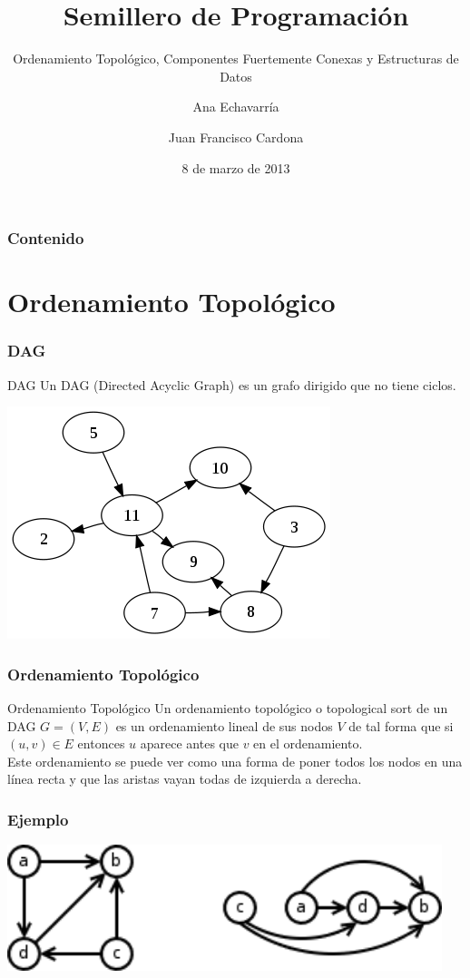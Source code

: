 \documentclass{beamer}
\title{Semillero de Programación}
\subtitle{Ordenamiento Topológico, Componentes Fuertemente Conexas y Estructuras de Datos}
\author{Ana Echavarría \and Juan Francisco Cardona}
\institute{Universidad EAFIT}
\date{8 de marzo de 2013}
\begin{document}
\begin{frame}
	\titlepage
\end{frame}

\begin{frame}
	\frametitle{Contenido}
	\tableofcontents
\end{frame}

\section{Ordenamiento Topológico}
	\begin{frame}
		\frametitle{DAG}
		\begin{block}{DAG}
			Un DAG (Directed Acyclic Graph) es un grafo dirigido que no tiene ciclos.
		\end{block}
		\begin{center} \includegraphics[height = 0.4\textheight]{DAG.png} \end{center}
	\end{frame}
	
	\begin{frame}
		\frametitle{Ordenamiento Topológico}
		\begin{block}{Ordenamiento Topológico}
			Un ordenamiento topológico o topological sort de un DAG $G = (V, E)$ es un ordenamiento lineal de sus nodos $V$ de tal forma que si $(u, v) \in E$ entonces $u$ aparece antes que $v$ en el ordenamiento.\\
			Este ordenamiento se puede ver como una forma de poner todos los nodos en una línea recta y que las aristas vayan todas de izquierda a derecha.
		\end{block}
	\end{frame}
	
	\begin{frame}
		\frametitle{Ejemplo}
		\includegraphics[width = 0.95\textwidth]{toposort.png}
	\end{frame}
	
\end{document}
